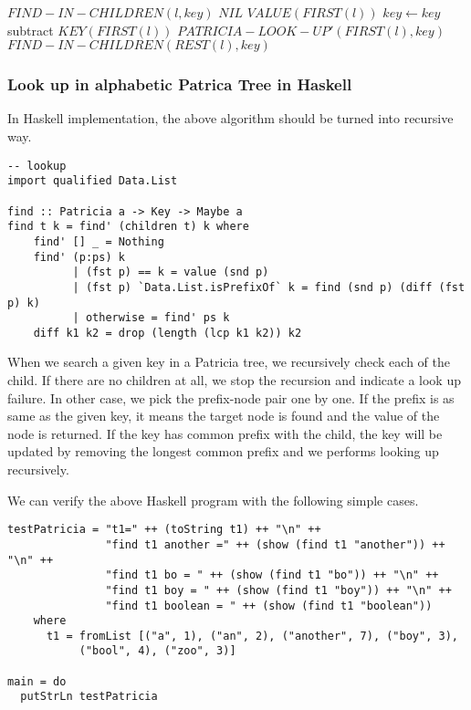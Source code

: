 \documentclass{article}
\begin{document}
\begin{algorithmic}
\STATE $FIND-IN-CHILDREN(l, key)$
    \RETURN $NIL$
    \RETURN $VALUE(FIRST(l))$
    \STATE $key \leftarrow key$ subtract $KEY(FIRST(l))$
    \RETURN $PATRICIA-LOOK-UP'(FIRST(l), key)$
  \ELSE
    \RETURN $FIND-IN-CHILDREN(REST(l), key)$
  \ENDIF
\end{algorithmic}

\subsubsection*{Look up in alphabetic Patrica Tree in Haskell}
In Haskell implementation, the above algorithm should be turned
into recursive way. 

\lstset{language=Haskell}
\begin{lstlisting}
-- lookup
import qualified Data.List

find :: Patricia a -> Key -> Maybe a
find t k = find' (children t) k where
    find' [] _ = Nothing
    find' (p:ps) k
          | (fst p) == k = value (snd p)
          | (fst p) `Data.List.isPrefixOf` k = find (snd p) (diff (fst p) k)
          | otherwise = find' ps k
    diff k1 k2 = drop (length (lcp k1 k2)) k2
\end{lstlisting}

When we search a given key in a Patricia tree, we recursively check each
of the child. If there are no children at all, we stop the recursion and 
indicate a look up failure. In other case, we pick the prefix-node pair
one by one. If the prefix is as same as the given key, it means the target
node is found and the value of the node is returned. If the key has common
prefix with the child, the key will be updated by removing the longest
common prefix and we performs looking up recursively.

We can verify the above Haskell program with the following simple cases.

\begin{lstlisting}
testPatricia = "t1=" ++ (toString t1) ++ "\n" ++
               "find t1 another =" ++ (show (find t1 "another")) ++ "\n" ++
               "find t1 bo = " ++ (show (find t1 "bo")) ++ "\n" ++
               "find t1 boy = " ++ (show (find t1 "boy")) ++ "\n" ++
               "find t1 boolean = " ++ (show (find t1 "boolean"))
    where
      t1 = fromList [("a", 1), ("an", 2), ("another", 7), ("boy", 3), 
           ("bool", 4), ("zoo", 3)]

main = do
  putStrLn testPatricia
\end{lstlisting}
\end{document}
